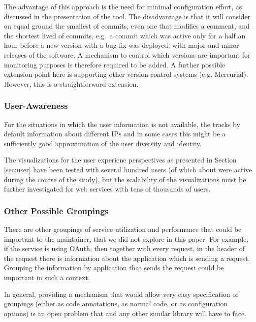\documentclass{sig-alternate-05-2015}
\begin{document}
  The advantage of this approach is the need for minimal configuration effort, as discussed in the presentation of the tool. The disadvantage is that it will consider on equal ground the smallest of commits, even one that modifies a comment, and the shortest lived of commits, e.g.~a commit which was active only for a half an hour before a new version with a bug fix was deployed, with major and minor releases of the software. %
  A mechanism to control which versions are important for monitoring purposes is therefore required to be added.
%
  A further possible extension point here is supporting other version control systems (e.g. Mercurial). However, this is a straightforward extension.



  \subsubsection{User-Awareness }

    For the situations in which the user information is not available, the \tool tracks by default information about different IPs and in some cases this might be a sufficiently good approximation of the user diversity and identity. 

    The visualizations for the user experiene perspectives as presented in Section \ref{sec:user} have been tested with several hundred users (of which about \activeUserCount were active during the course of the study), but the scalability of the visualizations must be further investigated for web services with tens of thousands of users.


  \subsubsection{Other Possible Groupings}

    There are other groupings of service utilization and performance that could be important to the maintainer, that we did not explore in this paper. For example, if the service is using OAuth, then together with every request, in the header of the request there is information about the application which is sending a request. Grouping the information by application that sends the request could be important in such a context. 

    In general, providing a mechanism that would allow very easy specification of groupings (either as code annotations, as normal code, or as configuration options) is an open problem that \tool and any other similar library will have to face.
\end{document}
